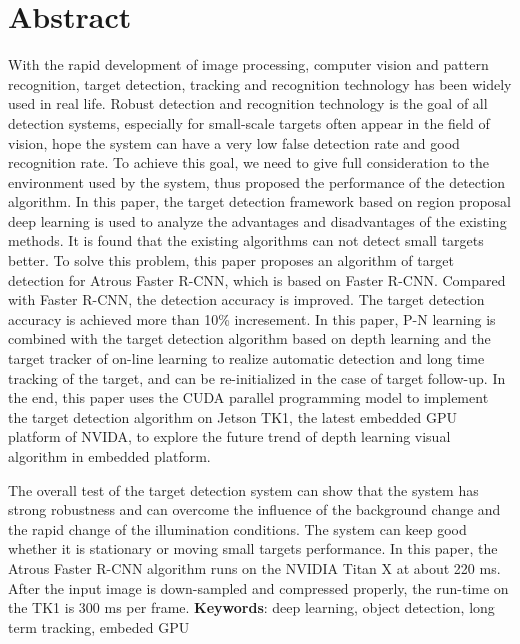 \chapter*{Abstract}
With the rapid development of image processing, computer vision and pattern recognition, target detection, tracking and recognition technology has been widely used in real life. Robust detection and recognition technology is the goal of all detection systems, especially for small-scale targets often appear in the field of vision, hope the system can have a very low false detection rate and good recognition rate. To achieve this goal, we need to give full consideration to the environment used by the system, thus proposed the performance of the detection algorithm. In this paper, the target detection framework based on region proposal deep learning is used to analyze the advantages and disadvantages of the existing methods. It is found that the existing algorithms can not detect small targets better. To solve this problem, this paper proposes an algorithm of target detection for Atrous Faster R-CNN, which is based on Faster R-CNN. Compared with Faster R-CNN, the detection accuracy is improved. The target detection accuracy is achieved more than 10\% incresement. In this paper, P-N learning is combined with the target detection algorithm based on depth learning and the target tracker of on-line learning to realize automatic detection and long time tracking of the target, and can be re-initialized in the case of target follow-up. In the end, this paper uses the CUDA parallel programming model to implement the target detection algorithm on Jetson TK1, the latest embedded GPU platform of NVIDA, to explore the future trend of depth learning visual algorithm in embedded platform.

The overall test of the target detection system can show that the system has strong robustness and can overcome the influence of the background change and the rapid change of the illumination conditions. The system can keep good whether it is stationary or moving small targets performance. In this paper, the Atrous Faster R-CNN algorithm runs on the NVIDIA Titan X at about 220 ms. After the input image is down-sampled and compressed properly, the run-time on the TK1 is 300 ms per frame.
\textbf{Keywords}: deep learning, object detection, long term tracking, embeded GPU